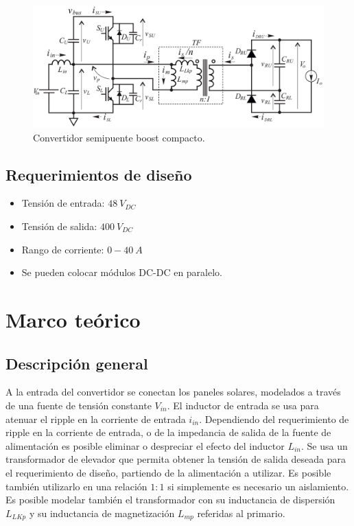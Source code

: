 \begin{figure}
	\centering
	\includegraphics[width=0.9\linewidth]{img/topologiaReferencia}
	\caption[]{Convertidor semipuente boost compacto.}
	\label{fig:topologiareferencia}
\end{figure}

\subsection{Requerimientos de diseño}

\begin{itemize}
	\item Tensión de entrada: $48 \ V_{DC}$
	\item Tensión de salida: $400 \ V_{DC}$
	\item Rango de corriente: $0-40 \ A$
	\item Se pueden colocar módulos DC-DC en paralelo.
\end{itemize}

\clearpage


\section{Marco teórico}

\subsection{Descripción general}

A la entrada del convertidor se conectan los paneles solares, modelados a través de una fuente de tensión constante $V_{in}$. El inductor de entrada se usa para atenuar el ripple en la corriente de entrada $i_{in}$. Dependiendo del requerimiento de ripple en la corriente de entrada, o de la impedancia de salida de la fuente de alimentación es posible eliminar o despreciar el efecto del inductor $L_{in}$. Se usa un transformador de elevador que permita obtener la tensión de salida deseada para el requerimiento de diseño, partiendo de la alimentación a utilizar. Es posible también utilizarlo en una relación $1:1$ si simplemente es necesario un aislamiento. Es posible modelar también el transformador con su inductancia de dispersión $L_{LKp}$ y su inductancia de magnetización $L_{mp}$ referidas al primario.

